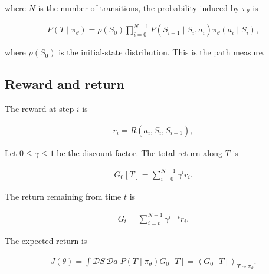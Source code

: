 \documentclass[11pt]{article}
\begin{document}
where \(N\) is the number of transitions, the probability induced by
\(\pi_\theta\) is

\begin{equation}
    \begin{split}
    P(T\mid\pi_\theta)=\rho(S_0)\prod_{i=0}^{N-1}
    P(S_{i+1}\mid S_i,a_i)\pi_\theta(a_i\mid S_i),
    \end{split}
    \label{eq:path-measure}
\end{equation}

where \(\rho(S_0)\) is the initial-state distribution.  This is the path
measure.

\subsection{Reward and return}

The reward at step \(i\) is

\begin{equation}
    \begin{split}
        r_i=R(a_i,S_i,S_{i+1}),
    \end{split}
    \label{eq:reward}
\end{equation}

Let \(0\leq\gamma\leq1\) be the discount factor.  The total return along
\(T\) is

\begin{equation}
    \begin{split}
        G_0[T]=\sum_{i=0}^{N-1}\gamma^i r_i.
    \end{split}
    \label{eq:return}
\end{equation}

The return remaining from time \(t\) is

\begin{equation}
    \begin{split}
        G_t=\sum_{i=t}^{N-1}\gamma^{i-t}r_i.
    \end{split}
    \label{eq:return-to-go}
\end{equation}

The expected return is

\begin{equation}
    \begin{split}
        J(\theta)=\int \mathcal D S\,\mathcal D a\;
        P(T\mid\pi_\theta)G_0[T]
        =\left\langle G_0[T]\right\rangle_{T\sim\pi_\theta}.
    \end{split}
    \label{eq:expected-return}
\end{equation}
\end{document}
